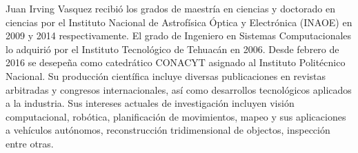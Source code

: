 Juan Irving Vasquez recibió los grados de maestría en ciencias y doctorado en ciencias por el Instituto Nacional de Astrofísica Óptica y Electrónica (INAOE) en 2009 y 2014 respectivamente. El grado de Ingeniero en Sistemas Computacionales lo adquirió por el Instituto Tecnológico de Tehuacán en 2006. Desde febrero de 2016 se desepeña como catedrático CONACYT asignado al Instituto Politécnico Nacional. Su producción científica incluye diversas publicaciones en revistas arbitradas y congresos internacionales, así como desarrollos tecnológicos aplicados a la industria. Sus intereses actuales de investigación incluyen visión computacional, robótica, planificación de movimientos, mapeo y sus aplicaciones a vehículos autónomos, reconstrucción tridimensional de objectos, inspección entre otras.
